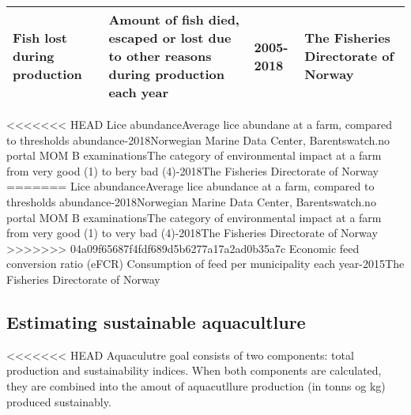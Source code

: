 \documentclass[
]{book}
\begin{document}
\begin{longtable}[]{@{}llll@{}}
\begin{minipage}[t]{0.23\columnwidth}
Fish lost during production\strut
\end{minipage} & \begin{minipage}[t]{0.22\columnwidth}\raggedright
Amount of fish died, escaped or lost due to other reasons during production each year\strut
\end{minipage} & \begin{minipage}[t]{0.25\columnwidth}\raggedright
2005-2018\strut
\end{minipage} & \begin{minipage}[t]{0.18\columnwidth}\raggedright
The Fisheries Directorate of Norway\strut
\end{minipage}\tabularnewline
\bottomrule
\end{longtable}

\textless\textless\textless\textless\textless\textless\textless{} HEAD
\textbar Lice abundance\textbar Average lice abundane at a farm, compared to thresholds abundance-2018\textbar Norwegian Marine Data Center, Barentswatch.no portal\textbar{}
\textbar MOM B examinations\textbar The category of environmental impact at a farm from very good (1) to bery bad (4)-2018\textbar The Fisheries Directorate of Norway\textbar{}
=======
\textbar Lice abundance\textbar Average lice abundance at a farm, compared to thresholds abundance-2018\textbar Norwegian Marine Data Center, Barentswatch.no portal\textbar{}
\textbar MOM B examinations\textbar The category of environmental impact at a farm from very good (1) to very bad (4)-2018\textbar The Fisheries Directorate of Norway\textbar{}
\textgreater\textgreater\textgreater\textgreater\textgreater\textgreater\textgreater{} 04a09f65687f4fdf689d5b6277a17a2ad0b35a7c
\textbar Economic feed conversion ratio (eFCR) \textbar Consumption of feed per municipality each year-2015\textbar The Fisheries Directorate of Norway\textbar{}

\hypertarget{estimating-sustainable-aquacultlure}{%
\subsection{Estimating sustainable aquacultlure}\label{estimating-sustainable-aquacultlure}}

\textless\textless\textless\textless\textless\textless\textless{} HEAD
Aquaculutre goal consists of two components: total production and sustainability indices. When both components are calculated, they are combined into the amout of aquacutllure production (in tonns og kg) produced sustainably.
\end{document}
